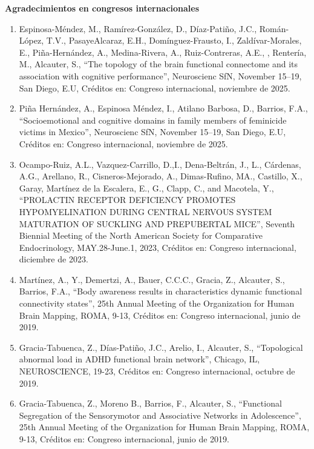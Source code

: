 {\large \textbf{Agradecimientos en congresos internacionales}}

\hrulefill

\begin{enumerate}

\item Espinosa-Méndez, M., Ramírez-González, D., Díaz-Patiño, J.C., Román-López, T.V., PasayeAlcaraz, E.H., Domínguez-Frausto, I., 
Zaldívar-Morales, E., Piña-Hernández, A., Medina-Rivera, A., Ruiz-Contreras, A.E., , Rentería, M., Alcauter, S., “The topology of the brain 
functional connectome and its association with cognitive performance”, Neuroscienc SfN, November 15–19, San Diego, E.U, Créditos en: Congreso 
internacional, noviembre de 2025.

\item Piña Hernández, A., Espinosa Méndez, I., Atilano Barbosa, D., Barrios, F.A., “Socioemotional and cognitive domains in family members of 
feminicide victims in Mexico”, Neuroscienc SfN, November 15–19, San Diego, E.U, Créditos en: Congreso internacional, noviembre de 2025.

\item Ocampo-Ruiz, A.L., Vazquez-Carrillo, D.,I., Dena-Beltrán, J., L., Cárdenas, A.G., Arellano, R., Cisneros-Mejorado, A., Dimas-Rufino, 
MA., 
Castillo, X., Garay, Martínez de la Escalera, E., G., Clapp, C., and Macotela, Y., “PROLACTIN RECEPTOR DEFICIENCY PROMOTES HYPOMYELINATION 
DURING CENTRAL NERVOUS SYSTEM MATURATION OF SUCKLING AND PREPUBERTAL MICE”, Seventh Biennial Meeting of the North American Society for 
Comparative Endocrinology, MAY.28-June.1, 2023, Créditos en: Congreso internacional, diciembre de 2023.

\item Martínez, A., Y., Demertzi, A., Bauer, C.C.C., Gracia, Z., Alcauter, S., Barrios, F.A., “Body awareness results in characteristics 
dynamic 
functional connectivity states”, 25th Annual Meeting of the Organization for Human Brain Mapping, ROMA, 9-13, Créditos en: Congreso 
internacional, junio de 2019.

\item Gracia-Tabuenca, Z., Días-Patiño, J.C., Arelio, I., Alcauter, S., “Topological abnormal load in ADHD functional brain network”, 
Chicago, IL, 
NEUROSCIENCE, 19-23, Créditos en: Congreso internacional, octubre de 2019.

\item Gracia-Tabuenca, Z., Moreno B., Barrios, F., Alcauter, S., “Functional Segregation of the Sensorymotor and Associative Networks in 
Adolescence”, 25th Annual Meeting of the Organization for Human Brain Mapping, ROMA, 9-13, Créditos en: Congreso internacional, junio de 
2019.


\end{enumerate}
